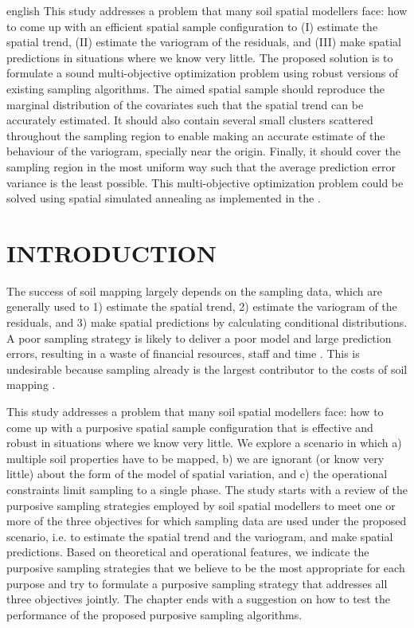 \begin{chapterabstract}{english}{\enkeys}
This study addresses a problem that many soil spatial modellers face: how to come up with an efficient spatial 
sample configuration to (I) estimate the spatial trend, (II) estimate the variogram of the residuals, and (III) 
make spatial predictions in situations where we know very little. The proposed solution is to formulate a sound 
multi-objective optimization problem using robust versions of existing sampling algorithms. The aimed spatial 
sample should reproduce the marginal distribution of the covariates such that the spatial trend can be 
accurately estimated. It should also contain several small clusters scattered throughout the sampling region to 
enable making an accurate estimate of the behaviour of the variogram, specially near the origin. Finally, it 
should cover the sampling region in the most uniform way such that the average prediction error variance is the 
least possible. This multi-objective optimization problem could be solved using spatial simulated annealing as 
implemented in the .
\end{chapterabstract}

\formatchapter

\section{INTRODUCTION}

The success of soil mapping largely depends on the sampling data, which are generally used to 1) estimate the 
spatial trend, 2) estimate the variogram of the residuals, and 3) make spatial predictions by calculating 
conditional distributions. A poor sampling strategy is likely to deliver a poor model and large prediction 
errors, resulting in a waste of financial resources, staff and time \cite{vanGroenigenEtAl1999,  
deGruijterEtAl2006, LanEtAl2010}. This is undesirable because sampling already is the largest contributor to 
the costs of soil mapping \cite{WebsterEtAl1990, vanGroenigenEtAl1999, KempenEtAl2012}.

This study addresses a problem that many soil spatial modellers face: how to come up with a purposive spatial 
sample configuration that is effective and robust in situations where we know very little. We explore a 
scenario in which a) multiple soil properties have to be mapped, b) we are ignorant (or know very little) about 
the form of the model of spatial variation, and c) the operational constraints limit sampling to a single 
phase. The study starts with a review of the purposive sampling strategies employed by soil spatial modellers 
to meet one or more of the three objectives for which sampling data are used under the proposed scenario, i.e. 
to estimate the spatial trend and the variogram, and make spatial predictions. Based on theoretical and 
operational features, we indicate the purposive sampling strategies that we believe to be the most appropriate 
for each purpose and try to formulate a purposive sampling strategy that addresses all three objectives 
jointly. The chapter ends with a suggestion on how to test the performance of the proposed purposive sampling 
algorithms.

